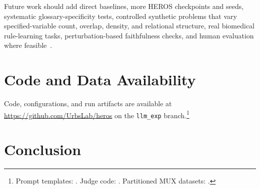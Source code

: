 \documentclass[sigconf]{acmart}
\begin{document}
Future work should add direct baselines, more HEROS checkpoints and seeds, systematic glossary-specificity tests, controlled synthetic problems that vary specified-variable count, overlap, density, and relational structure, real biomedical rule-learning tasks, perturbation-based faithfulness checks, and human evaluation \\where feasible~\cite{hoffman2023measures,holzinger2020scs}.


\section{Code and Data Availability}
Code, configurations, and run artifacts are available at \\ \url{https://github.com/UrbsLab/heros} on the \texttt{llm\_exp} branch.\footnote{Prompt templates: . Judge code: . Partitioned MUX datasets: .}

\section{Conclusion}
\end{document}

